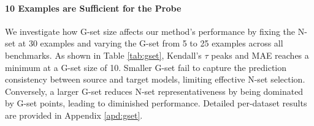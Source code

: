 
\paragraph{10 Examples are Sufficient for the Probe} 
We investigate how G-set size affects our method's performance by fixing the N-set at 30 examples and varying the G-set from 5 to 25 examples across all benchmarks. As shown in Table \ref{tab:gset}, Kendall's $\tau$ peaks and MAE reaches a minimum at a G-set size of 10. Smaller G-set fail to capture the prediction consistency between source and target models, limiting effective N-set selection. Conversely, a larger G-set reduces N-set representativeness by being dominated by G-set points, leading to diminished performance. Detailed per-dataset results are provided in Appendix \ref{apd:gset}.

